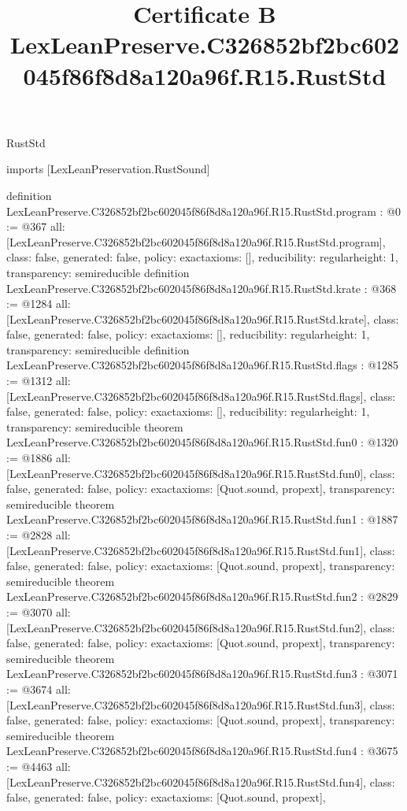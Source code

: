\begin{lexlean}{RustStd}
\title{Certificate B LexLeanPreserve.C326852bf2bc602045f86f8d8a120a96f.R15.RustStd}
\begin{coremodule}
imports [LexLeanPreservation.RustSound]

definition LexLeanPreserve.C326852bf2bc602045f86f8d8a120a96f.R15.RustStd.program : @0 := @367 {
  all: [LexLeanPreserve.C326852bf2bc602045f86f8d8a120a96f.R15.RustStd.program],
  class: false,
  generated: false,
  policy: exact{axioms: []},
  reducibility: regular{height: 1},
  transparency: semireducible
}
definition LexLeanPreserve.C326852bf2bc602045f86f8d8a120a96f.R15.RustStd.krate : @368 := @1284 {
  all: [LexLeanPreserve.C326852bf2bc602045f86f8d8a120a96f.R15.RustStd.krate],
  class: false,
  generated: false,
  policy: exact{axioms: []},
  reducibility: regular{height: 1},
  transparency: semireducible
}
definition LexLeanPreserve.C326852bf2bc602045f86f8d8a120a96f.R15.RustStd.flags : @1285 := @1312 {
  all: [LexLeanPreserve.C326852bf2bc602045f86f8d8a120a96f.R15.RustStd.flags],
  class: false,
  generated: false,
  policy: exact{axioms: []},
  reducibility: regular{height: 1},
  transparency: semireducible
}
theorem LexLeanPreserve.C326852bf2bc602045f86f8d8a120a96f.R15.RustStd.fun0 : @1320 := @1886 {
  all: [LexLeanPreserve.C326852bf2bc602045f86f8d8a120a96f.R15.RustStd.fun0],
  class: false,
  generated: false,
  policy: exact{axioms: [Quot.sound, propext]},
  transparency: semireducible
}
theorem LexLeanPreserve.C326852bf2bc602045f86f8d8a120a96f.R15.RustStd.fun1 : @1887 := @2828 {
  all: [LexLeanPreserve.C326852bf2bc602045f86f8d8a120a96f.R15.RustStd.fun1],
  class: false,
  generated: false,
  policy: exact{axioms: [Quot.sound, propext]},
  transparency: semireducible
}
theorem LexLeanPreserve.C326852bf2bc602045f86f8d8a120a96f.R15.RustStd.fun2 : @2829 := @3070 {
  all: [LexLeanPreserve.C326852bf2bc602045f86f8d8a120a96f.R15.RustStd.fun2],
  class: false,
  generated: false,
  policy: exact{axioms: [Quot.sound, propext]},
  transparency: semireducible
}
theorem LexLeanPreserve.C326852bf2bc602045f86f8d8a120a96f.R15.RustStd.fun3 : @3071 := @3674 {
  all: [LexLeanPreserve.C326852bf2bc602045f86f8d8a120a96f.R15.RustStd.fun3],
  class: false,
  generated: false,
  policy: exact{axioms: [Quot.sound, propext]},
  transparency: semireducible
}
theorem LexLeanPreserve.C326852bf2bc602045f86f8d8a120a96f.R15.RustStd.fun4 : @3675 := @4463 {
  all: [LexLeanPreserve.C326852bf2bc602045f86f8d8a120a96f.R15.RustStd.fun4],
  class: false,
  generated: false,
  policy: exact{axioms: [Quot.sound, propext]},
}
\end{coremodule}
\end{lexlean}
